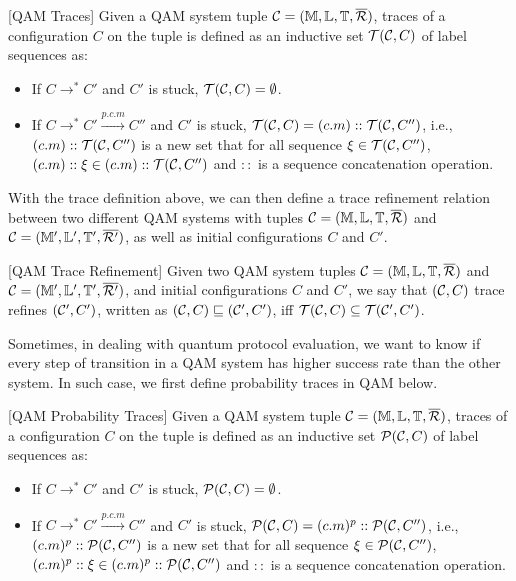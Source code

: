 \begin{definition}\label{def:traces}\rm[QAM Traces]
Given a QAM system tuple $\mathcal{C}=(\mathbb{M},\mathbb{L},\mathbb{T},\overline{\mathcal{R}})$, traces of a configuration $C$ on the tuple is defined as an inductive set $\mathcal{T}(\mathcal{C},C)$ of label sequences as:

\begin{itemize}
\item If $C \longrightarrow^* C'$ and $C'$ is stuck, $\mathcal{T}(\mathcal{C},C)=\emptyset$.
\item If $C \longrightarrow^* C' \xrightarrow{p.c.m} C''$ and $C'$ is stuck, $\mathcal{T}(\mathcal{C},C)=(c.m)::\mathcal{T}(\mathcal{C},C'')$, i.e., $(c.m)::\mathcal{T}(\mathcal{C},C'')$ is a new set that for all sequence $\xi \in \mathcal{T}(\mathcal{C},C'')$, $(c.m)::\xi \in (c.m)::\mathcal{T}(\mathcal{C},C'')$ and $::$ is a sequence concatenation operation.
\end{itemize}
\end{definition}

With the trace definition above, we can then define a trace refinement relation between two different QAM systems with tuples $\mathcal{C}=(\mathbb{M},\mathbb{L},\mathbb{T},\overline{\mathcal{R}})$ and $\mathcal{C}=(\mathbb{M}',\mathbb{L}',\mathbb{T}',\overline{\mathcal{R}'})$, as well as initial configurations $C$ and $C'$.

\begin{definition}\label{def:traceeq}\rm[QAM Trace Refinement]
Given two QAM system tuples $\mathcal{C}=(\mathbb{M},\mathbb{L},\mathbb{T},\overline{\mathcal{R}})$ and $\mathcal{C}=(\mathbb{M}',\mathbb{L}',\mathbb{T}',\overline{\mathcal{R}'})$, and initial configurations $C$ and $C'$,  we say that $(\mathcal{C},C)$ trace refines $(\mathcal{C}',C')$, written as $(\mathcal{C},C) \sqsubseteq (\mathcal{C}',C')$, iff $\mathcal{T}(\mathcal{C},C)\subseteq \mathcal{T}(\mathcal{C}',C')$.

\end{definition}

Sometimes, in dealing with quantum protocol evaluation, we want to know if every step of transition in a QAM system has higher success rate than the other system. In such case, we first define probability traces in QAM below.

\begin{definition}\label{def:ptraces}\rm[QAM Probability Traces]
Given a QAM system tuple $\mathcal{C}=(\mathbb{M},\mathbb{L},\mathbb{T},\overline{\mathcal{R}})$, traces of a configuration $C$ on the tuple is defined as an inductive set $\mathcal{P}(\mathcal{C},C)$ of label sequences as:

\begin{itemize}
\item If $C \longrightarrow^* C'$ and $C'$ is stuck, $\mathcal{P}(\mathcal{C},C)=\emptyset$.
\item If $C \longrightarrow^* C' \xrightarrow{p.c.m} C''$ and $C'$ is stuck, $\mathcal{P}(\mathcal{C},C)=(c.m)^p::\mathcal{P}(\mathcal{C},C'')$, i.e., $(c.m)^p::\mathcal{P}(\mathcal{C},C'')$ is a new set that for all sequence $\xi \in \mathcal{P}(\mathcal{C},C'')$, $(c.m)^p::\xi \in (c.m)^p::\mathcal{P}(\mathcal{C},C'')$ and $::$ is a sequence concatenation operation.
\end{itemize}
\end{definition}

